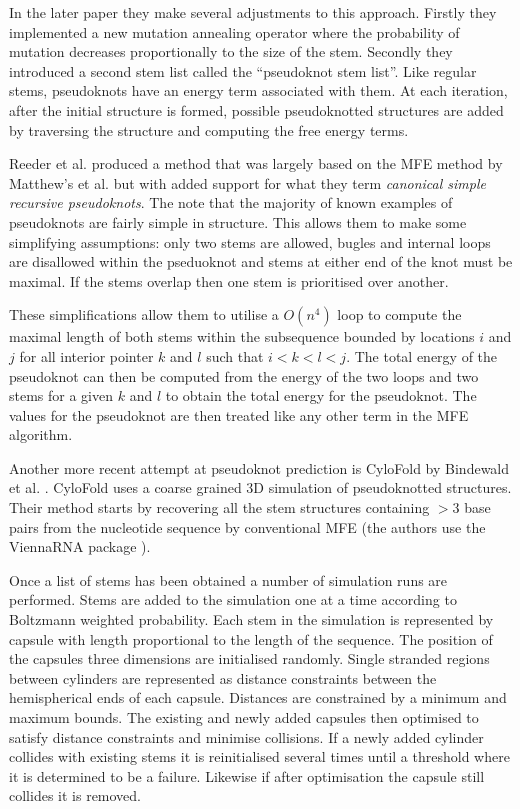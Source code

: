 \documentclass[journal]{IEEEtran}
\begin{document}
In the later paper \cite{shapiro1997predicting} they make several adjustments to this approach. Firstly they implemented a new mutation annealing operator where the probability of mutation decreases proportionally to the size of the stem. Secondly they introduced a second stem list called the ``pseudoknot stem list''. Like regular stems, pseudoknots have an energy term associated with them. At each iteration, after the initial structure is formed, possible pseudoknotted structures are added by traversing the structure and computing the free energy terms.

Reeder et al. \cite{reeder2007pknotsrg} produced a method that was largely based on the MFE method by Matthew's et al. \cite{mathews1999expanded} but with added support for what they term \textit{canonical simple recursive pseudoknots}. The note that the majority of known examples of pseudoknots are fairly simple in structure. This allows them to make some simplifying assumptions: only two stems are allowed, bugles and internal loops are disallowed within the pseduoknot and stems at either end of the knot must be maximal. If the stems overlap then one stem is prioritised over another. 

These simplifications allow them to utilise a $O(n^4)$ loop to compute the maximal length of both stems within the subsequence bounded by locations $i$ and $j$ for all interior pointer $k$ and $l$ such that $i < k < l < j$. The total energy of the pseudoknot can then be computed from the energy of the two loops and two stems for a given $k$ and $l$ to obtain the total energy for the pseudoknot. The values for the pseudoknot are then treated like any other term in the MFE algorithm.

Another more recent attempt at pseudoknot prediction is CyloFold by Bindewald et al. \cite{bindewald2010cylofold}. CyloFold uses a coarse grained 3D simulation of pseudoknotted structures. Their method starts by recovering all the stem structures containing $>3$ base pairs from the nucleotide sequence by conventional MFE (the authors use the ViennaRNA package \cite{lorenz2011viennarna}). 

Once a list of stems has been obtained a number of simulation runs are performed. Stems are added to the simulation one at a time according to Boltzmann weighted probability. Each stem in the simulation is represented by capsule with length proportional to the length of the sequence. The position of the capsules three dimensions are initialised randomly. Single stranded regions between cylinders are represented as distance constraints between the hemispherical ends of each capsule. Distances are constrained by a minimum and maximum bounds. The existing and newly added capsules then optimised to satisfy distance constraints and minimise collisions. If a newly added cylinder collides with existing stems it is reinitialised several times until a threshold where it is determined to be a failure. Likewise if after optimisation the capsule still collides it is removed.
\end{document}
